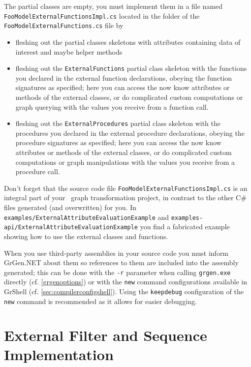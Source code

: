 \noindent The partial classes are empty, you must implement them in a file named \texttt{FooModelExternal\-FunctionsImpl.cs} located in the folder of the \texttt{FooModelExternalFunctions.cs} file by
\begin{itemize}
	\item fleshing out the partial classes skeletons with attributes containing data of interest and maybe helper methods
	\item fleshing out the \texttt{ExternalFunctions} partial class skeleton with the functions you declared in the external function declarations, obeying the function signatures as specified; here you can access the now know attributes or methods of the external classes, or do complicated custom computations or graph querying with the values you receive from a function call.
	\item fleshing out the \texttt{ExternalProcedures} partial class skeleton with the procedures you declared in the external procedure declarations, obeying the procedure signatures as specified; here you can access the now know attributes or methods of the external classes, or do complicated custom computations or graph manipulations with the values you receive from a procedure call.
\end{itemize}

\noindent Don't forget that the source code file \texttt{FooModelExternalFunctionsImpl.cs} is an integral part of your \GrG~graph transformation project, in contrast to the other C\# files generated (and overwritten) for you.
In \texttt{examples/ExternalAttributeEvaluationExample} and \texttt{examples-api/ExternalAttributeEvaluationExample}
you find a fabricated example showing how to use the external classes and functions.

When you use third-party assemblies in your source code you must inform GrGen.NET about them so references to them are included into the assembly generated; this can be done with the \texttt{-r} parameter when calling \texttt{grgen.exe} directly (cf. \ref{grgenoptions}) or with the \texttt{new} command configurations available in GrShell (cf. \ref{sec:compilerconfigshell}). Using the \texttt{keepdebug} configuration of the \texttt{new} command is recommended as it allows for easier debugging.


\section{External Filter and Sequence Implementation}\label{sub:extfltseqimpl}

